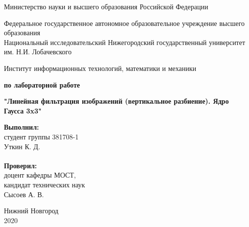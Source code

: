 \documentclass{report}
\begin{document}

	\begin{titlepage}
	
		\begin{center}
			Министерство науки и высшего образования Российской Федерации
		\end{center}

		\begin{center}
			Федеральное государственное автономное образовательное учреждение высшего образования \\
			Национальный исследовательский Нижегородский государственный университет им. Н.И. Лобачевского
		\end{center}

		\begin{center}
			Институт информационных технологий, математики и механики
		\end{center}

		\vspace{\fill}

		\begin{center}
			\textbf{ по лабораторной работе} \\
		\end{center}

		\begin{center}
			\textbf{\Large"Линейная фильтрация изображений (вертикальное разбиение). Ядро Гаусса 3x3"} \\
		\end{center}

		\vspace{\fill}

		\hfill\parbox{6cm}{
			\hspace*{5cm}\hspace*{-5cm}\textbf{Выполнил:} \\ студент группы 381708-1 \\ Уткин К. Д. \\
			\\
			\hspace*{5cm}\hspace*{-5cm}\textbf{Проверил:}\\ доцент кафедры МОСТ, \\ кандидат технических наук \\ Сысоев А. В.
		}

		\vspace{\fill}

		\begin{center}
			Нижний Новгород \\ 2020
		\end{center}

	\end{titlepage}
\end{document}
